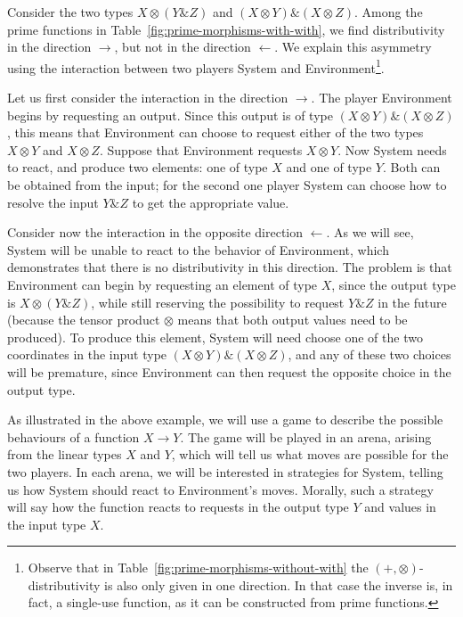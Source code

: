 \documentclass[a4paper,UKenglish,cleveref, autoref, numberwithinsect, thm-restate]{lipics-v2021}
\begin{document}
\begin{example}\label{ex:amp-otimes-distr}
    Consider the two types $X \otimes (Y \& Z)$ and $(X \otimes Y) \& (X \otimes Z)$.
    Among the prime functions in Table~\ref{fig:prime-morphisms-with-with}, we find distributivity in the direction $\rightarrow$, but not in the direction $\leftarrow$. We explain this asymmetry using the interaction between two players System and Environment\footnote{
        Observe that in Table~\ref{fig:prime-morphisms-without-with} the $(+, \otimes)$-distributivity is also only given in one direction. In that case the inverse is, in fact, a single-use function, as it can be constructed from prime functions.
    }.

    Let us first consider the interaction in the  direction $\rightarrow$. The player Environment begins by requesting an output. Since this output is of type $(X \otimes Y) \& (X \otimes Z)$, this means that Environment can choose to request either of the two types  $X \otimes Y$ and $X \otimes Z$. Suppose that Environment requests $X \otimes Y$. Now System needs to react, and produce two elements: one of type $X$ and one of type $Y$. Both can be obtained from the input; for the second one player System can choose how to resolve the input $Y \& Z$ to get the appropriate value. 

    Consider now the interaction in the opposite direction $\leftarrow$. As we will see, System will be unable to react to the behavior of Environment, which demonstrates that there is no distributivity in this direction. The problem is that Environment can begin by requesting an element of type $X$, since the output type is $X \otimes (Y \& Z)$, while still reserving the possibility to request $Y \& Z$ in the future (because the tensor product $\otimes$ means that both output values need to be produced). To produce this element, System will need  choose one of the two coordinates in the input type $(X \otimes Y) \& (X \otimes Z)$, and any of these two  choices will be premature, since Environment can then request the opposite choice in the output type.  \exampleend
\end{example}

As illustrated in the above example, we will use a game to describe the possible behaviours of a function $X \to Y$. The game will be played in an arena, arising from the linear types $X$ and $Y$, which will tell us what moves are possible for the two players. In each arena, we will be interested in strategies for System, telling us how System should react to Environment's moves. Morally, such a strategy will say how the function reacts to requests in the output type $Y$ and values in the input type $X$.
\end{document}
